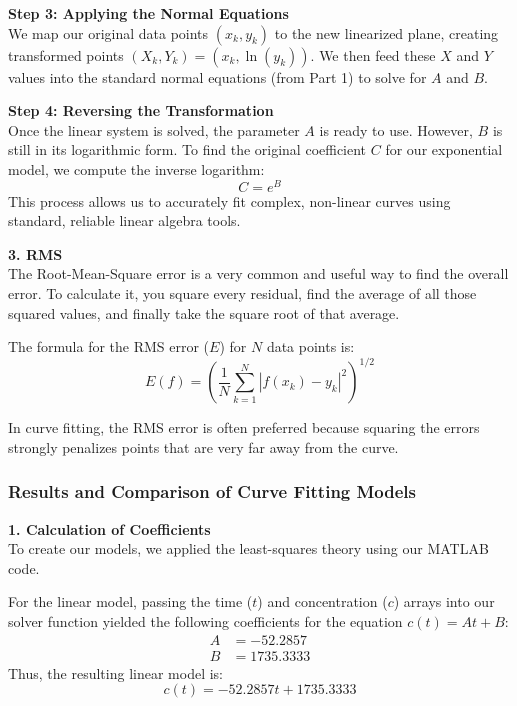 \documentclass{article}
\begin{document}
\vspace{5pt}
\noindent \textbf{Step 3: Applying the Normal Equations} \\
We map our original data points $(x_k, y_k)$ to the new linearized plane, creating transformed points $(X_k, Y_k) = (x_k, \ln(y_k))$. We then feed these $X$ and $Y$ values into the standard normal equations (from Part 1) to solve for $A$ and $B$.

\vspace{5pt}
\noindent \textbf{Step 4: Reversing the Transformation} \\
Once the linear system is solved, the parameter $A$ is ready to use. However, $B$ is still in its logarithmic form. To find the original coefficient $C$ for our exponential model, we compute the inverse logarithm:
\begin{equation*}
    C = e^B
\end{equation*}
This process allows us to accurately fit complex, non-linear curves using standard, reliable linear algebra tools.

\vspace{5pt}
\noindent \textbf{3. RMS} \cite[page 253]{MathewsFink2003} \\
The Root-Mean-Square error is a very common and useful way to find the overall error. To calculate it, you square every residual, find the average of all those squared values, and finally take the square root of that average.

The formula for the RMS error ($E$) for $N$ data points is:
\begin{equation}
    E(f) = \left( \frac{1}{N} \sum_{k=1}^{N} |f(x_k) - y_k|^2 \right)^{1/2}
\end{equation}

In curve fitting, the RMS error is often preferred because squaring the errors strongly penalizes points that are very far away from the curve.

\subsubsection{Results and Comparison of Curve Fitting Models}

\vspace{5pt}
\noindent \textbf{1. Calculation of Coefficients} \\
To create our models, we applied the least-squares theory using our MATLAB code. 

For the linear model, passing the time ($t$) and concentration ($c$) arrays into our solver function yielded the following coefficients for the equation $c(t) = At + B$:
\begin{align*}
    A &= -52.2857 \\
    B &= 1735.3333
\end{align*}
Thus, the resulting linear model is:
\begin{equation*}
    c(t) = -52.2857t + 1735.3333
\end{equation*}
\end{document}

